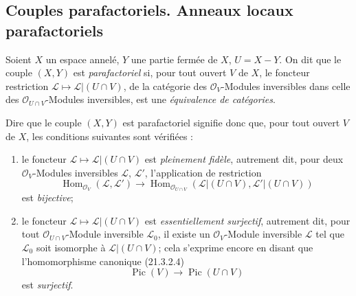 \subsection{Couples parafactoriels. Anneaux locaux parafactoriels}
\label{IV.21.13}

\begin{definition}[21.13.1]
Soient $X$ un espace annelé, $Y$ une partie fermée de $X$, $U=X-Y$.
On dit que le couple $(X,Y)$ est \emph{parafactoriel} si, pour tout ouvert $V$ de $X$,
le foncteur restriction
$\mathscr L\mapsto\mathscr L|(U\cap V)$, de la catégorie des
$\mathcal O_V$-Modules inversibles dans celle des $\mathcal O_{U\cap V}$-Modules
inversibles, est une \emph{équivalence de catégories}.
\end{definition}

Dire que le couple $(X,Y)$ est parafactoriel signifie donc que, pour tout ouvert $V$
de $X$, les conditions suivantes sont vérifiées :
\begin{enumerate}[label=\arabic*\textsuperscript{o}]
  \item le foncteur $\mathscr L\mapsto\mathscr L|(U\cap V)$ est \emph{pleinement
  fidèle}, autrement dit, pour deux $\mathcal O_V$-Modules inversibles $\mathscr L$,
  $\mathscr L'$, l'application de restriction
  \[
    \operatorname{Hom}_{\mathcal O_V}(\mathscr L,\mathscr L')
    \longrightarrow
    \operatorname{Hom}_{\mathcal O_{U\cap V}}
    (\mathscr L|(U\cap V),\mathscr L'|(U\cap V))
  \]
  est \emph{bijective};
  \item le foncteur $\mathscr L\mapsto\mathscr L|(U\cap V)$ est
  \emph{essentiellement surjectif}, autrement dit, pour tout
  $\mathcal O_{U\cap V}$-Module inversible $\mathscr L_0$, il existe un
  $\mathcal O_V$-Module inversible $\mathscr L$ tel que $\mathscr L_0$ soit
  isomorphe à $\mathscr L|(U\cap V)$; cela s'exprime encore en disant que
  l'homomorphisme canonique (21.3.2.4)
  \[
    \operatorname{Pic}(V)\longrightarrow\operatorname{Pic}(U\cap V)
  \]
  est \emph{surjectif}.
\end{enumerate}

